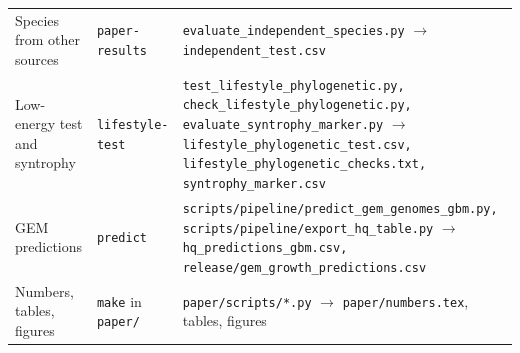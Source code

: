 \begin{table}[ht]
\begin{tabular}{>{\raggedright}p{3.4cm}>{\raggedright}p{2.7cm}>{\raggedright\arraybackslash}p{9.6cm}}
Species from other sources & \texttt{paper-results} & \texttt{evaluate\_independent\_species.py} \newline $\to$ \texttt{independent\_test.csv} \\
Low-energy test and syntrophy & \texttt{lifestyle-test} & \texttt{test\_lifestyle\_phylogenetic.py, check\_lifestyle\_phylogenetic.py, evaluate\_syntrophy\_marker.py} \newline $\to$ \texttt{lifestyle\_phylogenetic\_test.csv, lifestyle\_phylogenetic\_checks.txt, syntrophy\_marker.csv} \\
GEM predictions & \texttt{predict} & \texttt{scripts/pipeline/predict\_gem\_genomes\_gbm.py, scripts/pipeline/export\_hq\_table.py} \newline $\to$ \texttt{hq\_predictions\_gbm.csv, release/gem\_growth\_predictions.csv} \\
Numbers, tables, figures & \texttt{make} in \texttt{paper/} & \texttt{paper/scripts/*.py} \newline $\to$ \texttt{paper/numbers.tex}, tables, figures \\
\bottomrule
\end{tabular}
\end{table}

